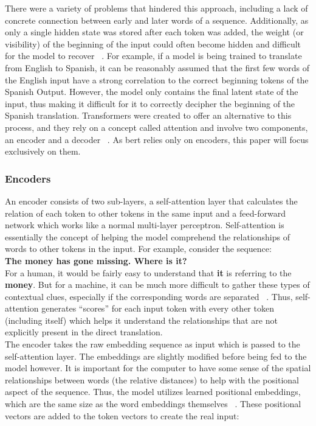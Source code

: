 \documentclass[12pt]{article}
\begin{document}
There were a variety of problems that hindered this approach, including a lack of concrete connection between early and later words of a sequence. Additionally, as only a single hidden state was stored after each token was added, the weight (or visibility) of the beginning of the input could often become hidden and difficult for the model to recover ~\parencite{hochreiter1997long}. 
For example, if a model is being trained to translate from English to Spanish, it can be reasonably assumed that the first few words of the English input have a strong correlation to the correct beginning tokens of the Spanish Output. However, the model only contains the final latent state of the input, thus making it difficult for it to correctly decipher the beginning of the Spanish translation. Transformers were created to offer an alternative to this process, and they rely on a concept called attention and involve two components, an encoder and a decoder ~\parencite{transformers:}. As \acrshort{bert} relies only on encoders, this paper will focus exclusively on them.

\subsubsection{Encoders}
An encoder consists of two sub-layers, a self-attention layer that calculates the relation of each token to other tokens in the same input and a feed-forward network which works like a normal multi-layer perceptron. Self-attention is essentially the concept of helping the model comprehend the relationships of words to other tokens in the input. For example, consider the sequence: \\

\textbf{The money has gone missing. Where is it?} \\

For a human, it would be fairly easy to understand that \textbf{it} is referring to the \textbf{money}. But for a machine, it can be much more difficult to gather these types of contextual clues, especially if the corresponding words are separated ~\parencite{hochreiter1997long}. Thus, self-attention generates “scores” for each input token with every other token (including itself) which helps it understand the relationships that are not explicitly present in the direct translation. \\

The encoder takes the raw embedding sequence as input which is passed to the self-attention layer. The embeddings are slightly modified before being fed to the model however. It is important for the computer to have some sense of the spatial relationships between words (the relative distances) to help with the positional aspect of the sequence. Thus, the model utilizes learned positional embeddings, which are the same size as the word embeddings themselves ~\parencite{devlin2019bert:}. These positional vectors are added to the token vectors to create the real input:
\end{document}
